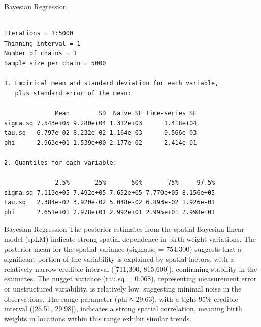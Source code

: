 \documentclass[
  ignorenonframetext,
]{beamer}
\newenvironment{Shaded}{\begin{snugshade}}{\end{snugshade}}
\newcommand{\AttributeTok}[1]{\textcolor[rgb]{0.40,0.45,0.13}{#1}}
\newcommand{\CommentTok}[1]{\textcolor[rgb]{0.37,0.37,0.37}{#1}}
\newcommand{\ConstantTok}[1]{\textcolor[rgb]{0.56,0.35,0.01}{#1}}
\newcommand{\DecValTok}[1]{\textcolor[rgb]{0.68,0.00,0.00}{#1}}
\newcommand{\FloatTok}[1]{\textcolor[rgb]{0.68,0.00,0.00}{#1}}
\newcommand{\FunctionTok}[1]{\textcolor[rgb]{0.28,0.35,0.67}{#1}}
\newcommand{\NormalTok}[1]{\textcolor[rgb]{0.00,0.23,0.31}{#1}}
\newcommand{\OtherTok}[1]{\textcolor[rgb]{0.00,0.23,0.31}{#1}}
\newcommand{\SpecialCharTok}[1]{\textcolor[rgb]{0.37,0.37,0.37}{#1}}
\begin{document}
\begin{frame}[fragile]{Bayesian Regression}
\label{bayesian-regression-3}
\begin{Shaded}
\end{Shaded}

\begin{verbatim}

Iterations = 1:5000
Thinning interval = 1 
Number of chains = 1 
Sample size per chain = 5000 

1. Empirical mean and standard deviation for each variable,
   plus standard error of the mean:

              Mean        SD  Naive SE Time-series SE
sigma.sq 7.543e+05 9.280e+04 1.312e+03      1.418e+04
tau.sq   6.797e-02 8.232e-02 1.164e-03      9.566e-03
phi      2.963e+01 1.539e+00 2.177e-02      2.414e-01

2. Quantiles for each variable:

              2.5%       25%       50%       75%     97.5%
sigma.sq 7.113e+05 7.492e+05 7.652e+05 7.770e+05 8.156e+05
tau.sq   2.384e-02 3.920e-02 5.048e-02 6.893e-02 1.926e-01
phi      2.651e+01 2.978e+01 2.992e+01 2.995e+01 2.998e+01
\end{verbatim}
\end{frame}

\begin{frame}{Bayesian Regression}
\label{bayesian-regression-4}
The posterior estimates from the spatial Bayesian linear model (spLM)
indicate strong spatial dependence in birth weight variations. The
posterior mean for the spatial variance (sigma.sq = 754,300) suggests
that a significant portion of the variability is explained by spatial
factors, with a relatively narrow credible interval ({[}711,300,
815,600{]}), confirming stability in the estimates. The nugget variance
(tau.sq = 0.068), representing measurement error or unstructured
variability, is relatively low, suggesting minimal noise in the
observations. The range parameter (phi ≈ 29.63), with a tight 95\%
credible interval ({[}26.51, 29.98{]}), indicates a strong spatial
correlation, meaning birth weights in locations within this range
exhibit similar trends.
\end{frame}
\end{document}
